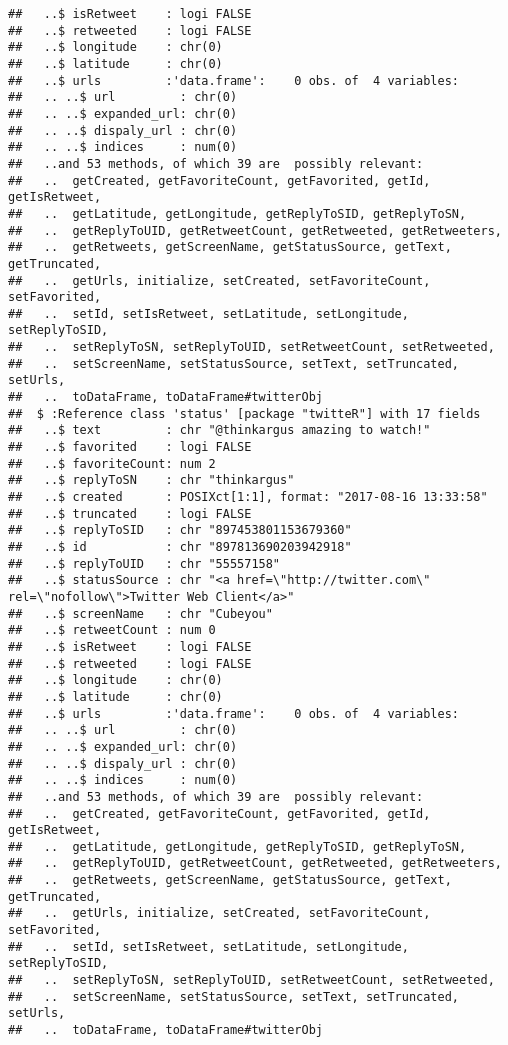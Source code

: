 \documentclass[]{article}
\begin{document}
\begin{verbatim}
##   ..$ isRetweet    : logi FALSE
##   ..$ retweeted    : logi FALSE
##   ..$ longitude    : chr(0) 
##   ..$ latitude     : chr(0) 
##   ..$ urls         :'data.frame':    0 obs. of  4 variables:
##   .. ..$ url         : chr(0) 
##   .. ..$ expanded_url: chr(0) 
##   .. ..$ dispaly_url : chr(0) 
##   .. ..$ indices     : num(0) 
##   ..and 53 methods, of which 39 are  possibly relevant:
##   ..  getCreated, getFavoriteCount, getFavorited, getId, getIsRetweet,
##   ..  getLatitude, getLongitude, getReplyToSID, getReplyToSN,
##   ..  getReplyToUID, getRetweetCount, getRetweeted, getRetweeters,
##   ..  getRetweets, getScreenName, getStatusSource, getText, getTruncated,
##   ..  getUrls, initialize, setCreated, setFavoriteCount, setFavorited,
##   ..  setId, setIsRetweet, setLatitude, setLongitude, setReplyToSID,
##   ..  setReplyToSN, setReplyToUID, setRetweetCount, setRetweeted,
##   ..  setScreenName, setStatusSource, setText, setTruncated, setUrls,
##   ..  toDataFrame, toDataFrame#twitterObj
##  $ :Reference class 'status' [package "twitteR"] with 17 fields
##   ..$ text         : chr "@thinkargus amazing to watch!"
##   ..$ favorited    : logi FALSE
##   ..$ favoriteCount: num 2
##   ..$ replyToSN    : chr "thinkargus"
##   ..$ created      : POSIXct[1:1], format: "2017-08-16 13:33:58"
##   ..$ truncated    : logi FALSE
##   ..$ replyToSID   : chr "897453801153679360"
##   ..$ id           : chr "897813690203942918"
##   ..$ replyToUID   : chr "55557158"
##   ..$ statusSource : chr "<a href=\"http://twitter.com\" rel=\"nofollow\">Twitter Web Client</a>"
##   ..$ screenName   : chr "Cubeyou"
##   ..$ retweetCount : num 0
##   ..$ isRetweet    : logi FALSE
##   ..$ retweeted    : logi FALSE
##   ..$ longitude    : chr(0) 
##   ..$ latitude     : chr(0) 
##   ..$ urls         :'data.frame':    0 obs. of  4 variables:
##   .. ..$ url         : chr(0) 
##   .. ..$ expanded_url: chr(0) 
##   .. ..$ dispaly_url : chr(0) 
##   .. ..$ indices     : num(0) 
##   ..and 53 methods, of which 39 are  possibly relevant:
##   ..  getCreated, getFavoriteCount, getFavorited, getId, getIsRetweet,
##   ..  getLatitude, getLongitude, getReplyToSID, getReplyToSN,
##   ..  getReplyToUID, getRetweetCount, getRetweeted, getRetweeters,
##   ..  getRetweets, getScreenName, getStatusSource, getText, getTruncated,
##   ..  getUrls, initialize, setCreated, setFavoriteCount, setFavorited,
##   ..  setId, setIsRetweet, setLatitude, setLongitude, setReplyToSID,
##   ..  setReplyToSN, setReplyToUID, setRetweetCount, setRetweeted,
##   ..  setScreenName, setStatusSource, setText, setTruncated, setUrls,
##   ..  toDataFrame, toDataFrame#twitterObj
\end{verbatim}
\end{document}
